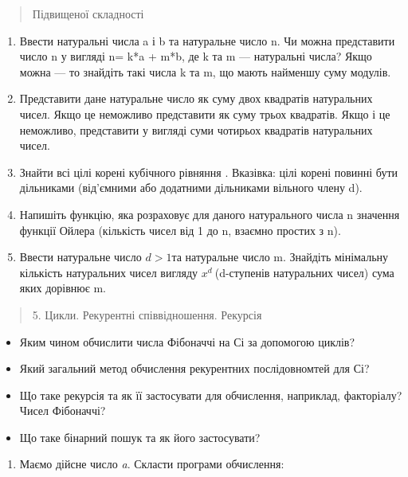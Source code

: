 \documentclass[]{article}
\begin{document}
\begin{quote}
Підвищеної складності
\end{quote}

\begin{enumerate}
\def\labelenumi{\arabic{enumi})}
\item
  Ввести натуральні числа a і b та натуральне число n. Чи можна
  представити число n у вигляді n= k*a + m*b, де k та m --- натуральні
  числа? Якщо можна --- то знайдіть такі числа k та m, що мають найменшу
  суму модулів.
\item
  Представити дане натуральне число як суму двох квадратів натуральних
  чисел. Якщо це неможливо представити як суму трьох квадратів. Якщо і
  це неможливо, представити у вигляді суми чотирьох квадратів
  натуральних чисел.
\item
  Знайти всі цілі корені кубічного рівняння . Вказівка: цілі корені
  повинні бути дільниками (від'ємними або додатними дільниками вільного
  члену d).
\item
  Напишіть функцію, яка розраховує для даного натурального числа n
  значення функції Ойлера (кількість чисел від 1 до n, взаємно простих з
  n).
\item
  Ввести натуральне число \(d > 1\)та натуральне число m. Знайдіть
  мінімальну кількість натуральних чисел вигляду \(x^{d}\ \)(d-ступенів
  натуральних чисел) сума яких дорівнює m.
\end{enumerate}

\begin{quote}
5. Цикли. Рекурентні співвідношення. Рекурсія
\end{quote}

\begin{itemize}
\item
  Яким чином обчислити числа Фібоначчі на Сі за допомогою циклів?
\item
  Який загальний метод обчислення рекурентних послідовномтей для Сі?
\item
  Що таке рекурсія та як її застосувати для обчислення, наприклад,
  факторіалу? Чисел Фібоначчі?
\item
  Що таке бінарний пошук та як його застосувати?
\end{itemize}

\begin{enumerate}
\def\labelenumi{\arabic{enumi})}
\item
  Маємо дійсне число \emph{a}. Скласти програми обчислення:
\end{enumerate}
\end{document}
